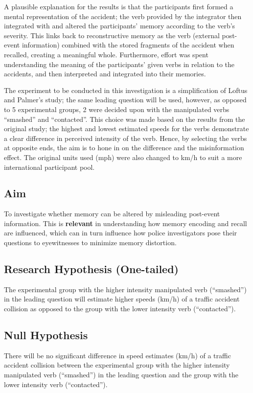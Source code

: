 \documentclass[12pt]{article}
\begin{document}
A plausible explanation for the results is that the participants first formed a mental representation of the accident; the verb provided by the integrator then integrated with and altered the participants’ memory according to the verb's severity. This links back to reconstructive memory as the verb (external post-event information) combined with the stored fragments of the accident when recalled, creating a meaningful whole. Furthermore, effort was spent understanding the meaning of the participants' given verbs in relation to the accidents, and then interpreted and integrated into their memories. 

The experiment to be conducted in this investigation is a simplification of Loftus and Palmer’s study; the same leading question will be used, however, as opposed to 5 experimental groups, 2 were decided upon with the manipulated verbs “smashed” and “contacted”. This choice was made based on the results from the original study; the highest and lowest estimated speeds for the verbs demonstrate a clear difference in perceived intensity of the verb. Hence, by selecting the verbs at opposite ends, the aim is to hone in on the difference and the misinformation effect. The original units used (mph) were also changed to km/h to suit a more international participant pool. 

\subsection{Aim}
To investigate whether memory can be altered by misleading post-event information. This is \textbf{relevant} in understanding how memory encoding and recall are influenced, which can in turn influence how police investigators pose their questions to eyewitnesses to minimize memory distortion.  

\subsection{Research Hypothesis (One-tailed)}
The experimental group with the higher intensity manipulated verb (“smashed”) in the leading question will estimate higher speeds (km/h) of a traffic accident collision as opposed to the group with the lower intensity verb (“contacted”). 

\subsection{Null Hypothesis}
There will be no significant difference in speed estimates (km/h) of a traffic accident collision between the experimental group with the higher intensity manipulated verb (“smashed”) in the leading question and the group with the lower intensity verb (“contacted”). 
\end{document}
